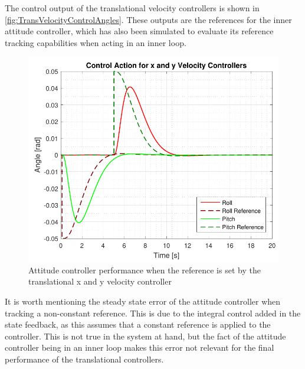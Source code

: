 The control output of the translational velocity controllers is shown in \autoref{fig:TransVelocityControlAngles}. These outputs are the references for the inner attitude controller, which has also been simulated to evaluate its reference tracking capabilities when acting in an inner loop.
\begin{figure}[H]
	\centering
	\includegraphics[scale=0.65]{figures/simVelocityControllerAngles}
	\caption{Attitude controller performance when the reference is set by the translational x and y velocity controller}
	\label{fig:TransVelocityControlAngles}
\end{figure}
It is worth mentioning the steady state error of the attitude controller when tracking a non-constant reference. This is due to the integral control added in the state feedback, as this assumes that a constant reference is applied to the controller. This is not true in the system at hand, but the fact of the attitude controller being in an inner loop makes this error not relevant for the final performance of the translational controllers. 


